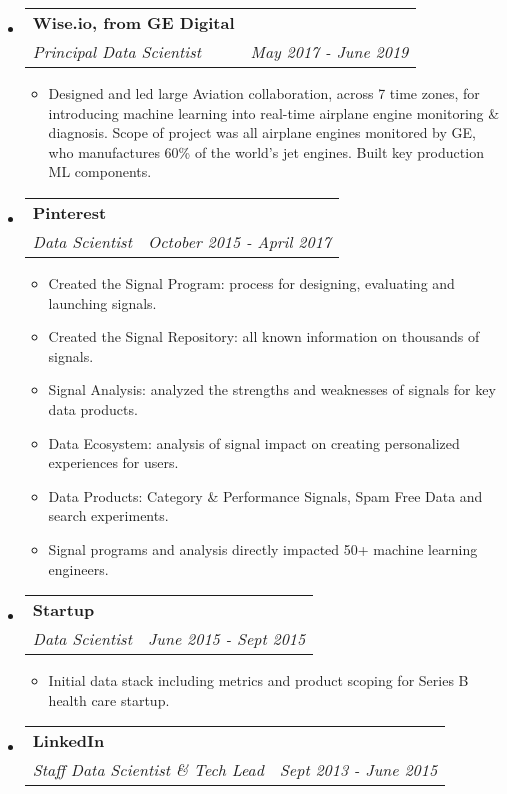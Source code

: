 \documentclass[letterpaper,11pt]{article}
\makeatletter
\newcommand{\resitem}[1]{\item #1 \vspace{-2pt}}
\newcommand{\ressubheading}[4]{

\begin{tabular*}{6.5in}{l@{\cftdotfill{\cftsecdotsep}\extracolsep{\fill}}r}

		\textbf{#1} & #2 \\

		\textit{#3} & \textit{#4} \\

\end{tabular*}\vspace{-6pt}}
\makeatother
\begin{document}
\begin{itemize}

\item 
	\ressubheading{\color{gecolor}Wise.io, from GE Digital}{}{Principal Data Scientist}{May 2017 - June 2019}

	\begin{itemize}
	    \resitem{Designed and led large Aviation collaboration, across 7 time zones, for introducing machine learning into real-time airplane engine monitoring \& diagnosis. Scope of project was all airplane engines monitored by GE, who manufactures 60\% of the world's jet engines. Built key production ML components.}
	\end{itemize}

\item 
	\ressubheading{\color{pinterestcolor}Pinterest}{}{Data Scientist}{October 2015 - April 2017}

	\begin{itemize}
	
		\resitem{Created the Signal Program: process for designing, evaluating and launching signals.}
		
		\resitem{Created the Signal Repository: all known information on thousands of signals.}
		
		\resitem{Signal Analysis: analyzed the strengths and weaknesses of signals for key data products.}
		
		\resitem{Data Ecosystem: analysis of signal impact on creating personalized experiences for users.}

		\resitem{Data Products: Category \& Performance Signals, Spam Free Data and search experiments.}
		
		\resitem{Signal programs and analysis directly impacted 50+ machine learning engineers.}
	\end{itemize}


\item 
	\ressubheading{\color{noomcolor}Startup}{}{Data Scientist}{June 2015 - Sept 2015}

	\begin{itemize}
	
		\resitem{Initial data stack including metrics and product scoping for Series B health care startup.}

	\end{itemize}
	
\item 
	\ressubheading{\color{linkedincolor}LinkedIn}{}{Staff Data Scientist \& Tech Lead}{Sept 2013 - June 2015}


\end{itemize}
\end{document}
